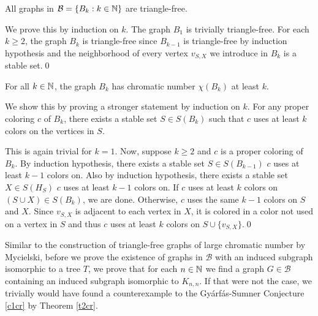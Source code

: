 \begin{thm}
All graphs in $\mathcal{B}=\lbrace B_k :k\in\mathbb{N}\rbrace$ are triangle-free.
\end{thm}

\begin{prf}
We prove this by induction on $k$. The graph $B_1$ is trivially triangle-free. For each $k\geq 2$, the graph $B_k$ is triangle-free since $B_{k-1}$ is triangle-free by induction hypothesis and the neighborhood of every vertex $v_{S,X}$ we introduce in $B_k$ is a stable set.\qed
\end{prf}

\begin{thm}\label{t2ls}
For all $k\in\mathbb{N}$, the graph $B_k$ has chromatic number $\chi (B_k)$ at least $k$.
\end{thm}

\begin{prf}
We show this by proving a stronger statement by induction on $k$. For any proper coloring $c$ of $B_k$, there exists a stable set $S\in S(B_k)$ such that $c$ uses at least $k$ colors on the vertices in $S$.

This is again trivial for $k=1$. Now, suppose $k\geq 2$ and $c$ is a proper coloring of $B_k$. By induction hypothesis, there exists a stable set $S\in S(B_{k-1})$ $c$ uses at least $k-1$ colors on. Also by induction hypothesis, there exists a stable set $X\in S(H_S)$ $c$ uses at least $k-1$ colors on. If $c$ uses at least $k$ colors on $(S\cup X)\in S(B_k)$, we are done. Otherwise, $c$ uses the same $k-1$ colors on $S$ and $X$. Since $v_{S,X}$ is adjacent to each vertex in $X$, it is colored in a color not used on a vertex in $S$ and thus $c$ uses at least $k$ colors on $S\cup\lbrace v_{S,X}\rbrace$.\qed 
\end{prf}

Similar to the construction of triangle-free graphs of large chromatic number by Mycielski, before we prove the existence of graphs in $\mathcal{B}$ with an induced subgraph isomorphic to a tree $T$, we prove that for each $n\in\mathbb{N}$ we find a graph $G\in\mathcal{B}$ containing an induced subgraph isomorphic to $K_{n,n}$. If that were not the case, we trivially would have found a counterexample to the Gyárfás-Sumner Conjecture \ref{c1cr} by Theorem \ref{t2cr}.

